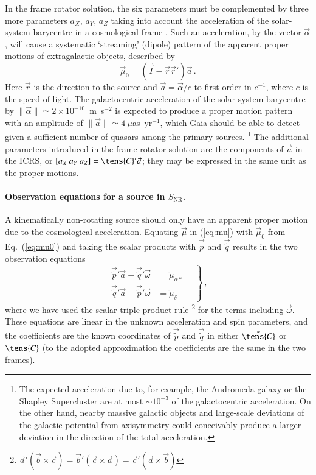 \documentclass[structabstract]{aa}
\begin{document}
In the frame rotator solution, the six parameters must be
complemented by three more parameters $a_X$, $a_Y$, $a_Z$
taking into account the acceleration of the solar-system barycentre 
in a cosmological frame \citep{bastian95,gwinn+97,kopeikin+06}.
Such an acceleration, by the vector $\vec{\alpha}$, will cause a systematic
`streaming' (dipole) pattern of the apparent proper motions of extragalactic 
objects, described by
\begin{equation}\label{eq:mu0}
\vec{\mu}_0 = (\vec{I}-\vec{r}\vec{r}')\vec{a} \, .
\end{equation} 
Here $\vec{r}$ is the direction to the source and $\vec{a}=\vec{\alpha}/c$
to first order in $c^{-1}$, where $c$ is the speed of light.
The galactocentric acceleration of the solar-system barycentre by 
$\|\vec{\alpha}\|\simeq 2\times 10^{-10}$~m~s$^{-2}$ is expected to produce 
a proper motion pattern with an amplitude of $\|\vec{a}\|\simeq 4~\mu$as~yr$^{-1}$,
which Gaia should be able to detect given a sufficient number of quasars
among the primary sources.%
\footnote{The expected acceleration due to, for example, the Andromeda 
galaxy or the Shapley Supercluster \citep{proust+06} are at most $\sim\! 10^{-3}$
of the galactocentric acceleration. On the other hand, nearby massive galactic
objects and large-scale deviations of the galactic potential from 
axisymmetry could conceivably produce a larger deviation in the direction
of the total acceleration.}
The additional parameters introduced in the
frame rotator solution are the components of $\vec{a}$ in the ICRS, or
$\left[a_X~a_Y~a_Z\right]=\tens{C}'\vec{a}$; they may be expressed in 
the same unit as the proper motions. 

\paragraph{Observation equations for a source in $S_\text{NR}$.}
A kinematically non-rotating source should only have an apparent
proper motion due to the cosmological acceleration. Equating $\vec{\mu}$ 
in (\ref{eq:mu}) with $\vec{\mu}_0$ from Eq.~(\ref{eq:mu0}) and taking 
the scalar products with $\vec{\tilde{p}}$ and $\vec{\tilde{q}}$ results 
in the two observation equations
\begin{equation}\label{eq:cond-mu1}
\left.
\begin{aligned}
\vec{\tilde{p}}'\vec{a} + \vec{\tilde{q}}'\vec{\omega} &= \tilde{\mu}_{\alpha*}
\\[3pt]
\vec{\tilde{q}}'\vec{a} - \vec{\tilde{p}}'\vec{\omega} &= \tilde{\mu}_{\delta}
\end{aligned}
\quad\right\} \, ,
\end{equation}
where we have used the scalar triple product rule%
\footnote{$\vec{a}'(\vec{b}\times\vec{c})=\vec{b}'(\vec{c}\times\vec{a})=
\vec{c}'(\vec{a}\times\vec{b})$}
for the terms including $\vec{\omega}$. These equations are linear in
the unknown acceleration and spin parameters, and the coefficients
are the known coordinates of $\vec{\tilde{p}}$ and $\vec{\tilde{q}}$ in
either $\tilde{\tens{C}}$ or $\tens{C}$ (to the adopted approximation 
the coefficients are the same in the two frames).
\end{document}
